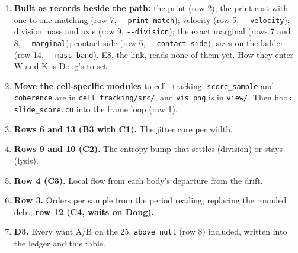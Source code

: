 \begin{enumerate}
\item \textbf{Built as records beside the path:} the print (row 2); the print cost with one-to-one matching (row 7, \texttt{-\allowbreak{}-\allowbreak{}print-\allowbreak{}match}); velocity (row 5, \texttt{-\allowbreak{}-\allowbreak{}velocity}); division mass and axis (row 9, \texttt{-\allowbreak{}-\allowbreak{}division}); the exact marginal (rows 7 and 8, \texttt{-\allowbreak{}-\allowbreak{}marginal}); contact side (row 6, \texttt{-\allowbreak{}-\allowbreak{}contact-\allowbreak{}side}); sizes on the ladder (row 14, \texttt{-\allowbreak{}-\allowbreak{}mass-\allowbreak{}band}). E8, the link, reads none of them yet. How they enter W and K is Doug's to set.
\item \textbf{Move the cell-specific modules} to cell\_\allowbreak{}tracking: \texttt{score\_\allowbreak{}sample} and \texttt{coherence} are in \texttt{cell\_\allowbreak{}tracking/\allowbreak{}src/\allowbreak{}}, and \texttt{vis\_\allowbreak{}png} is in \texttt{view/\allowbreak{}}. Then hook \texttt{slide\_\allowbreak{}score.\allowbreak{}cu} into the frame loop (row 1).
\item \textbf{Rows 6 and 13 (B3 with C1).} The jitter core per width.
\item \textbf{Rows 9 and 10 (C2).} The entropy bump that settles (division) or stays (lysis).
\item \textbf{Row 4 (C3).} Local flow from each body's departure from the drift.
\item \textbf{Row 3.} Orders per sample from the period reading, replacing the rounded debt; \textbf{row 12 (C4, waits on Doug).}
\item \textbf{D3.} Every want A/B on the 25, \texttt{above\_\allowbreak{}null} (row 8) included, written into the ledger and this table.
\end{enumerate}

